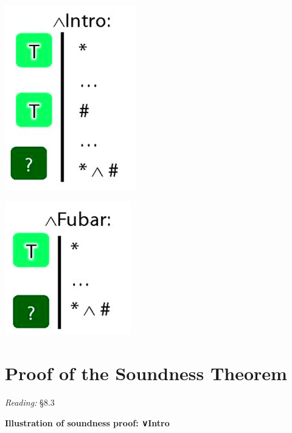 \documentclass[12pt]{extarticle}
\begin{document}
\begin{multicols*}{3}
\begin{center}
\includegraphics[scale=0.3]{img/unit_346_and.png}
\end{center}
\begin{center}
\includegraphics[scale=0.3]{img/unit_346_fubar.png}
\end{center}
 
 
\section{Proof of the Soundness Theorem}
 
\emph{Reading:} §8.3
 
\begin{minipage}{\columnwidth}
 
\textbf{Illustration of soundness proof: ∨Intro}
 

\end{minipage}
\end{multicols*}
\end{document}
